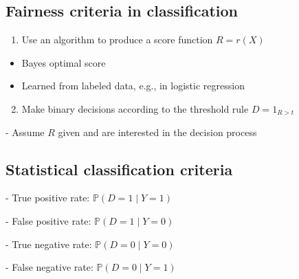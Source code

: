 



\subsection*{Fairness criteria in classification}

\begin{enumerate}
  \item Use an algorithm to produce a score function $R=r(X)$
\end{enumerate}

\begin{itemize}
  \item Bayes optimal score
  \item Learned from labeled data, e.g., in logistic regression
\end{itemize}

\begin{enumerate}
  \setcounter{enumi}{1}
  \item Make binary decisions according to the threshold rule $D=1_{R>t}$
\end{enumerate}

- Assume $R$ given and are interested in the decision process

\subsection*{Statistical classification criteria}

- True positive rate: $\mathbb{P}(D=1 \mid Y=1)$

- False positive rate: $\mathbb{P}(D=1 \mid Y=0)$

- True negative rate: $\mathbb{P}(D=0 \mid Y=0)$

- False negative rate: $\mathbb{P}(D=0 \mid Y=1)$

